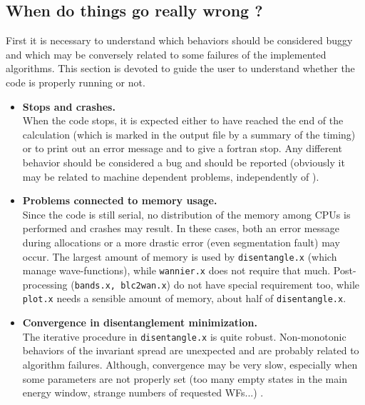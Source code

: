 \subsection{When do things go really wrong ?}
First it is necessary to understand which behaviors should be considered buggy and
which may be conversely related to some failures of the implemented algorithms.
This section is devoted to guide the user to understand whether the code is
properly running or not. \\
%
%
\begin{itemize}
\item   {\bf Stops and crashes.} \\
        When the code stops, it is expected either to have reached the end
        of the calculation (which is marked in the output file by a summary
        of the timing) or to print
        out an error message and to give a fortran stop. Any different behavior
        should be considered a bug and should be reported
        (obviously it may be related to machine dependent problems,
        independently of \WANT).

\item   {\bf Problems connected to memory usage.} \\
        Since the code is still serial, no distribution of the memory among
        CPUs is performed and crashes may result. In these cases, both an
        error message during allocations or a more drastic error (even segmentation
        fault) may occur. The largest amount of memory is used by
        {\tt disentangle.x} (which manage wave-functions), while {\tt wannier.x}
        does not require that much. Post-processing ({\tt bands.x, blc2wan.x})
        do not have special requirement too, while {\tt plot.x} needs a sensible
        amount of memory, about half of {\tt disentangle.x}.

\item   {\bf Convergence in disentanglement minimization.} \\
        The iterative procedure in {\tt disentangle.x} is quite robust.
        Non-monotonic behaviors of the invariant spread are unexpected
        and are probably related to algorithm failures. Although, convergence
        may be very slow, especially when some parameters are not properly set
        (too many empty states in the main energy window, strange numbers of
        requested WFs...) .


\end{itemize}

